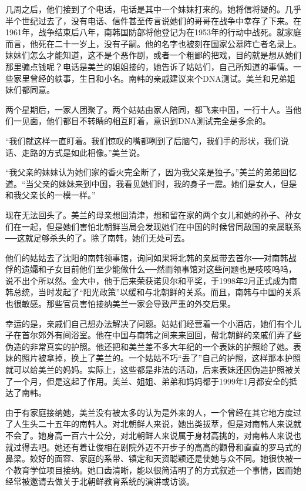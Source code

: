 几周之后，他们接到了个电话，电话是其中一个妹妹打来的。她将信将疑的。几乎半个世纪过去了，没有电话、信件甚至传言说她们的哥哥在战争中幸存了下来。在1961年，战争结束后八年，南韩国防部将他登记为在1953年的行动中战死。就家庭而言，他死在二十一岁上，没有子嗣。他的名字也被刻在国家公墓阵亡者名录上。妹妹们怎么才能知道，这不是个恶作剧，或者一个粗鄙的把戏，目的就是想从她们那里骗点钱呢？电话是美兰的姐姐接的，她告诉了姑姑们，自己所知道的事情。一些家里曾经的轶事，生日和小名。南韩的亲戚建议来个DNA测试。美兰和兄弟姐妹们都同意。

两个星期后，一家人团聚了。两个姑姑由家人陪同，都飞来中国，一行十人。当他们一见面，他们都目不转睛的相互盯着，意识到DNA测试完全是多余的。

“我们就这样一直盯着。我们惊叹的嘴都咧到了后脑勺，我们手的形状，我们说话、走路的方式是如此相像。”美兰说。

“我父亲的妹妹认为她们家的香火完全断了，因为我父亲是独子。”美兰的弟弟回忆道。“当父亲的妹妹来到中国，我看见她们时，我的身子一震。她们是女人，但是和我父亲长的一模一样。”

现在无法回头了。美兰的母亲想回清津，想和留在家的两个女儿和她的孙子、孙女们在一起，但是她们害怕北朝鲜当局会发现她们在中国的时候曾同敌国的亲属联系──这就足够杀头的了。除了南韩，她们无处可去。

他们的姑姑去了沈阳的南韩领事馆，询问如果将北韩的亲属带去首尔──对南韩战俘的遗孀和子女目前他们至少能做什么──然而领事馆对这些问题也是吱吱呜呜，说不出个所以然。金大中，他于后来荣获诺贝尔和平奖，于1998年2月正式成为南韩总统，当时发起了“阳光政策”以缓和与北朝鲜的关系。而且，南韩与中国的关系也很敏感。那些官员害怕接纳美兰一家会导致严重的外交后果。

幸运的是，亲戚们自己想办法解决了问题。姑姑们经营着一个小酒店，她们有个儿子在首尔郊外有间浴室。他在中国与南韩之间来来回回，帮北朝鲜的亲戚们弄了些伪造的非常真实的护照。他还把和美兰差不多大年纪的一个表妹的护照给了她。表妹的照片被拿掉，换上了美兰的。一个姑姑不巧“丢了”自己的护照，这样那本护照就可以给美兰的妈妈。实际上，这些都是非法的活动，后来表妹还因伪造护照被关了一个月，但是这起了作用。美兰、姐姐、弟弟和妈妈都于1999年1月都安全的抵达了南韩。

由于有家庭接纳她，美兰没有被太多的认为是外来的人，一个曾经在其它地方度过了人生头二十五年的南韩人。对北朝鲜人来说，她出类拔萃，但是对南韩人来说就不会了。她身高一百六十公分，对北朝鲜人来说属于身材高挑的，对南韩人来说也就过得去吧。她还有着让俊相在剧院外迈不开步子的高高的颧骨和直直的罗马式的鼻梁。姣好的面容、家庭的系带、镇定和天资聪颖还是使她与众不同。她很快被一个教育学位项目接纳。她口齿清晰，能以很简洁明了的方式叙述一个事情，因而她经常被邀请去做关于北朝鲜教育系统的演讲或访谈。


